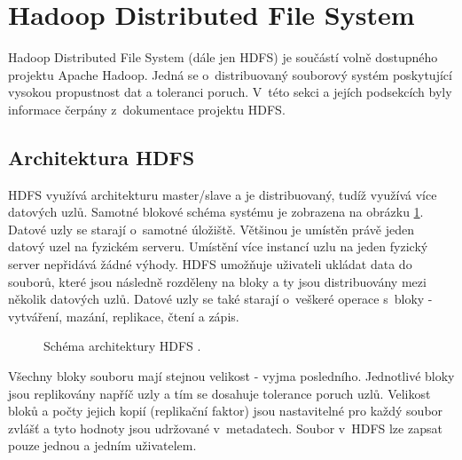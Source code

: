 \section{Hadoop Distributed File System} \label{HDFS}
Hadoop Distributed File System (dále jen HDFS) je součástí volně dostupného projektu Apache Hadoop. Jedná se o~distribuovaný souborový systém poskytující vysokou propustnost dat a toleranci poruch. V~této sekci a jejích podsekcích byly informace čerpány z~dokumentace projektu HDFS\cite{HDFSDoku}.

\subsection{Architektura HDFS}
HDFS využívá architekturu master/slave a je distribuovaný, tudíž využívá více datových uzlů. Samotné blokové schéma systému je zobrazena na obrázku \ref{pic:hdfs_architecture}. Datové uzly se starají o~samotné úložiště. Většinou je umístěn právě jeden datový uzel na fyzickém serveru. Umístění více instancí uzlu na jeden fyzický server nepřidává žádné výhody. HDFS umožňuje uživateli ukládat data do souborů, které jsou následně rozděleny na bloky a ty jsou distribuovány mezi několik datových uzlů. Datové uzly se také starají o~veškeré operace s~bloky - vytváření, mazání, replikace, čtení a zápis.

\begin{figure}[h]
  \centering
  \caption{Schéma architektury HDFS \cite{HDFSDoku}.}\label{pic:hdfs_architecture}
\end{figure}

Všechny bloky souboru mají stejnou velikost - vyjma posledního. Jednotlivé bloky jsou replikovány napříč uzly a tím se dosahuje tolerance poruch uzlů. Velikost bloků a počty jejich kopií (replikační faktor) jsou nastavitelné pro každý soubor zvlášť a tyto hodnoty jsou udržované v~metadatech. Soubor v~HDFS lze zapsat pouze jednou a jedním uživatelem. 


